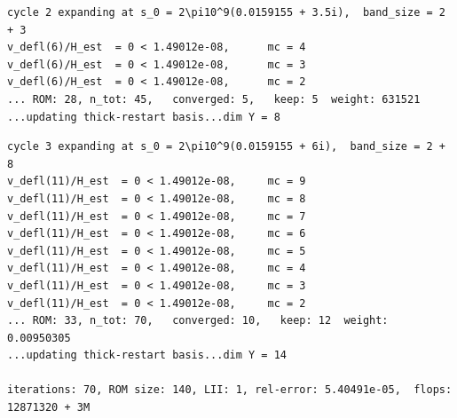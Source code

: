 \begin{verbatim}
cycle 2 expanding at s_0 = 2\pi10^9(0.0159155 + 3.5i),  band_size = 2 + 3 
v_defl(6)/H_est  = 0 < 1.49012e-08, 	 mc = 4
v_defl(6)/H_est  = 0 < 1.49012e-08, 	 mc = 3
v_defl(6)/H_est  = 0 < 1.49012e-08, 	 mc = 2
... ROM: 28, n_tot: 45,   converged: 5,   keep: 5  weight: 631521
...updating thick-restart basis...dim Y = 8

\end{verbatim}


\begin{verbatim}
cycle 3 expanding at s_0 = 2\pi10^9(0.0159155 + 6i),  band_size = 2 + 8 
v_defl(11)/H_est  = 0 < 1.49012e-08, 	 mc = 9
v_defl(11)/H_est  = 0 < 1.49012e-08, 	 mc = 8
v_defl(11)/H_est  = 0 < 1.49012e-08, 	 mc = 7
v_defl(11)/H_est  = 0 < 1.49012e-08, 	 mc = 6
v_defl(11)/H_est  = 0 < 1.49012e-08, 	 mc = 5
v_defl(11)/H_est  = 0 < 1.49012e-08, 	 mc = 4
v_defl(11)/H_est  = 0 < 1.49012e-08, 	 mc = 3
v_defl(11)/H_est  = 0 < 1.49012e-08, 	 mc = 2
... ROM: 33, n_tot: 70,   converged: 10,   keep: 12  weight: 0.00950305
...updating thick-restart basis...dim Y = 14

iterations: 70, ROM size: 140, LII: 1, rel-error: 5.40491e-05,  flops: 12871320 + 3M
\end{verbatim}



